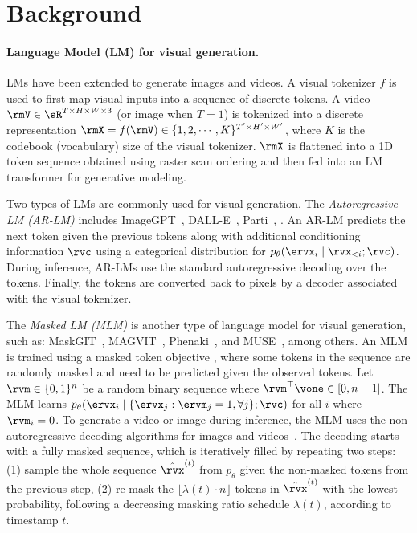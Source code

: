 \vspace{-4mm}
\section{Background} \label{sec:background}
\vspace{-4mm}
\paragraph{Language Model (LM) for visual generation.}
LMs have been extended to generate images and videos. A visual tokenizer $f$ is used to first map visual inputs into a sequence of discrete tokens. A video  $\rmV \in \sR^{T \times H \times W \times 3}$ (or image when $T=1$) is tokenized into a discrete representation $\rmX = f(\rmV) \in \{1, 2, \cdots, K\}^{T' \times H' \times W'}$, where $K$ is the codebook (vocabulary) size of the visual tokenizer. $\rmX$ is flattened into a 1D token sequence obtained using raster scan ordering and then fed into an LM transformer for generative modeling. 

Two types of LMs are commonly used for visual generation. The \emph{Autoregressive LM (AR-LM)} includes ImageGPT~\citep{chen2020generative}, DALL-E~\citep{ramesh2021zero}, Parti~\citep{yu2022scaling}, \etc. 
An AR-LM predicts the next token given the previous tokens along with additional conditioning information $\rvc$ using a categorical distribution for $p_\theta(\ervx_i \mid \rvx_{<i}; \rvc)$. During inference, AR-LMs use the standard autoregressive decoding over the tokens. Finally, the tokens are converted back to pixels by a decoder associated with the visual tokenizer.

The \emph{Masked LM (MLM)} is another type of language model for visual generation, such as: MaskGIT~\citep{chang2022maskgit}, MAGVIT~\citep{yu2022magvit}, Phenaki~\citep{villegas2022phenaki}, and MUSE~\citep{chang2023muse}, among others. An MLM is trained using a masked token objective \citep{devlin2019bert}, where some tokens in the sequence are randomly masked and need to be predicted given the observed tokens. Let $\rvm \in \{0,1\}^n$ be a random binary sequence where $\rvm^\top \vone \in [0, n-1]$. The MLM learns $p_\theta(\ervx_i \mid \{\ervx_j: \ervm_j=1, \forall j\}; \rvc)$ for all $i$ where $\rvm_i=0$. To generate a video or image during inference, the MLM uses the non-autoregressive decoding algorithms
for images and videos~\citep{chang2022maskgit,yu2022magvit}. 
The decoding starts with a fully masked sequence, which is iteratively filled by repeating two steps: (1) sample the whole sequence $\hat{\rvx}^{(t)}$ from $p_\theta$ given the non-masked tokens from the previous step, (2) re-mask the $\lfloor\lambda(t)\cdot n\rfloor$ tokens in $\hat{\rvx}^{(t)}$ with the lowest probability, following a decreasing masking ratio schedule $\lambda(t)$, according to timestamp $t$.

